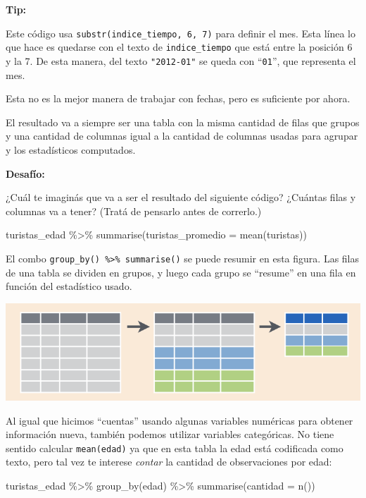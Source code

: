 \documentclass[
  openany]{book}
\newenvironment{Shaded}{\begin{snugshade}}{\end{snugshade}}
\newcommand{\AttributeTok}[1]{\textcolor[rgb]{0.77,0.63,0.00}{#1}}
\newcommand{\FunctionTok}[1]{\textcolor[rgb]{0.00,0.00,0.00}{#1}}
\newcommand{\NormalTok}[1]{#1}
\newcommand{\SpecialCharTok}[1]{\textcolor[rgb]{0.00,0.00,0.00}{#1}}
\begin{document}
\textbf{Tip:}

Este código usa \texttt{substr(indice\_tiempo,\ 6,\ 7)} para definir el mes.
Esta línea lo que hace es quedarse con el texto de \texttt{indice\_tiempo} que está entre la posición 6 y la 7.
De esta manera, del texto \texttt{"2012-01"} se queda con ``\texttt{01}'', que representa el mes.

Esta no es la mejor manera de trabajar con fechas, pero es suficiente por ahora.

El resultado va a siempre ser una tabla con la misma cantidad de filas que grupos y una cantidad de columnas igual a la cantidad de columnas usadas para agrupar y los estadísticos computados.

\textbf{Desafío:}

¿Cuál te imaginás que va a ser el resultado del siguiente código?
¿Cuántas filas y columnas va a tener?
(Tratá de pensarlo antes de correrlo.)

\begin{Shaded}
\begin{Highlighting}[]
\NormalTok{turistas\_edad }\SpecialCharTok{\%\textgreater{}\%} 
   \FunctionTok{summarise}\NormalTok{(}\AttributeTok{turistas\_promedio =} \FunctionTok{mean}\NormalTok{(turistas))}
\end{Highlighting}
\end{Shaded}

El combo \texttt{group\_by()\ \%\textgreater{}\%\ summarise()} se puede resumir en esta figura.
Las filas de una tabla se dividen en grupos, y luego cada grupo se ``resume'' en una fila en función del estadístico usado.

\includegraphics{img/group_by-summarize.png}

Al igual que hicimos ``cuentas'' usando algunas variables numéricas para obtener información nueva, también podemos utilizar variables categóricas.
No tiene sentido calcular \texttt{mean(edad)} ya que en esta tabla la edad está codificada como texto, pero tal vez te interese \emph{contar} la cantidad de observaciones por edad:

\begin{Shaded}
\begin{Highlighting}[]
\NormalTok{turistas\_edad }\SpecialCharTok{\%\textgreater{}\%} 
  \FunctionTok{group\_by}\NormalTok{(edad) }\SpecialCharTok{\%\textgreater{}\%} 
  \FunctionTok{summarise}\NormalTok{(}\AttributeTok{cantidad =} \FunctionTok{n}\NormalTok{())}
\end{Highlighting}
\end{Shaded}
\end{document}
